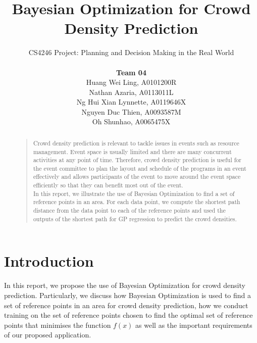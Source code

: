 \documentclass[letterpaper]{article}
\begin{document}
%
\title{Bayesian Optimization for Crowd Density Prediction}
\author{CS4246 Project: Planning and Decision Making in the Real World  \\ \\
{\bf Team 04} \\
Huang Wei Ling, A0101200R\\
Nathan Azaria, A0113011L\\
Ng Hui Xian Lynnette, A0119646X\\
Nguyen Duc Thien, A0093587M\\
Oh Shunhao, A0065475X\\
}
\maketitle
\begin{abstract}
\begin{quote}
Crowd density prediction is relevant to tackle issues in events such as resource management. Event space is usually limited and there are many concurrent activities at any point of time. Therefore, crowd density prediction is useful for the event committee to plan the layout and schedule of the programs in an event effectively and allows participants of the event to move around the event space efficiently so that they can benefit most out of the event. \\

In this report, we illustrate the use of Bayesian Optimization to find a set of reference points in an area. For each data point, we compute the shortest path distance from the data point to each of the reference points and used the outputs of the shortest path for GP regression to predict the crowd densities.
\end{quote}
\end{abstract}

\section{Introduction}
In this report, we propose the use of Bayesian Optimization for crowd density prediction. Particularly, we discuss how Bayesian Optimization is used to find a set of reference points in an area for crowd density prediction, how we conduct training on the set of reference points chosen to find the optimal set of reference points that minimises the function $f(x)$ as well as the important requirements of our proposed application. \\
\end{document}

